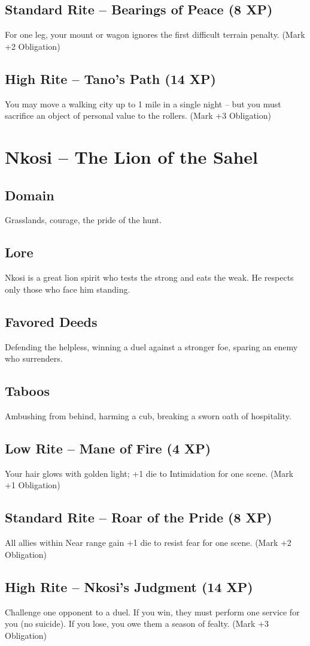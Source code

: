 \documentclass[11pt]{book}
\begin{document}
\subsection*{Standard Rite -- Bearings of Peace (8 XP)}
For one leg, your mount or wagon ignores the first difficult terrain penalty. (Mark +2 Obligation)
\subsection*{High Rite -- Tano's Path (14 XP)}
You may move a walking city up to 1 mile in a single night -- but you must sacrifice an object of personal value to the rollers. (Mark +3 Obligation)

\section{Nkosi -- The Lion of the Sahel}
\subsection*{Domain}
Grasslands, courage, the pride of the hunt.
\subsection*{Lore}
Nkosi is a great lion spirit who tests the strong and eats the weak. He respects only those who face him standing.
\subsection*{Favored Deeds}
Defending the helpless, winning a duel against a stronger foe, sparing an enemy who surrenders.
\subsection*{Taboos}
Ambushing from behind, harming a cub, breaking a sworn oath of hospitality.
\subsection*{Low Rite -- Mane of Fire (4 XP)}
Your hair glows with golden light; +1 die to Intimidation for one scene. (Mark +1 Obligation)
\subsection*{Standard Rite -- Roar of the Pride (8 XP)}
All allies within Near range gain +1 die to resist fear for one scene. (Mark +2 Obligation)
\subsection*{High Rite -- Nkosi's Judgment (14 XP)}
Challenge one opponent to a duel. If you win, they must perform one service for you (no suicide). If you lose, you owe them a season of fealty. (Mark +3 Obligation)
\end{document}
